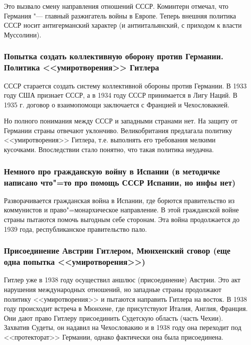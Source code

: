 Это вызвало смену направления отношений СССР. Коминтерн отмечал, что Германия "--- главный разжигатель войны в Европе. Теперь внешняя политика СССР носит антигерманский характер (и антиитальянский, с приходом к власти Муссолини). 

\subsubsection{\textbf{Попытка создать коллективную оборону против Германии. Политика <<умиротворения>> Гитлера}}

СССР старается создать систему коллективной обороны против Германии. В 1933 году США признает СССР, а в 1934 году СССР принимается в Лигу Наций. В 1935 г. договор о взаимопомощи заключается с Францией и Чехословакией.

Но полного понимания между СССР и западными странами нет. На защиту от Германии страны отвечают уклончиво. Великобритания предлагала политику <<умиротворения>> Гитлера, т.е. выполнять его требования мелкими кусочками. Впоследствии стало понятно, что такая политика неудачна. 

\subsubsection{\textbf{Немного про гражданскую войну в Испании (в методичке написано что"=то про помощь СССР Испании, но инфы нет)}}

Разворачивается гражданская война в Испании, где борются правительство из коммунистов и право"=монархическое направление. В этой гражданской войне страны пытаются помочь выгодным себе сторонам. Эта война продолжается до 1939 года, республиканское правительство пало.

\subsubsection{\textbf{Присоединение Австрии Гитлером, Мюнхенский сговор (еще одна попытка <<умиротворения>>)}}

Гитлер уже в 1938 году осуществил аншлюс (присоединение) Австрии. Это акт нарушения международных отношений, но западные страны продолжают политику <<умиротворения>> и пытаются направить Гитлера на восток. В 1938 году происходит встреча в Мюнхене, где присутствуют Италия, Англия, Франция. Они дают право Гитлеру присоединить Судетскую область (часть Чехии). Захватив Судеты, он надавил на Чехословакию и в 1938 году она переходит под <<протекторат>> Германии, однако фактически она была присоединена.

